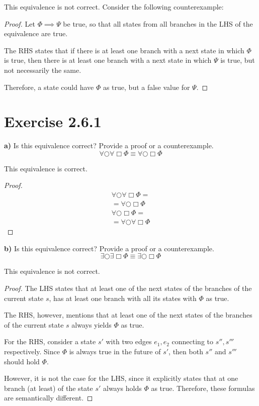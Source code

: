 \documentclass[titlepage, letterpaper, fleqn]{article}
\begin{document}
This equivalence is not correct. Consider the following counterexample:

\begin{proof}
Let \(\Phi \implies \Psi\) be true, so that all states from all branches in the LHS of the equivalence are true.

The RHS states that if there is at least one branch with a next state  in which \(\Phi\) is true, then there is at least one branch with a next state in which \(\Psi\) is true, but not necessarily the same.

Therefore, a state could have \(\Phi\) as true, but a false value for \(\Psi\).
\end{proof}

\pagebreak

\section{Exercise 2.6.1}

{\large \textbf{a)} Is this equivalence correct? Provide a proof or a counterexample.
\[\forall \bigcirc \forall \Box \Phi \equiv \forall \bigcirc \Box \Phi\]}

This equivalence is correct.

\begin{proof}
\begin{align*}
& \forall \bigcirc \forall \Box \Phi =
\\ & = \forall \bigcirc \Box \Phi & \tag*{Quantifier absorption}
\end{align*}
\begin{align*}
& \forall \bigcirc \Box \Phi =
\\ & = \forall \bigcirc \forall \Box \Phi & \tag*{Quantifier absorption}
\end{align*}
\end{proof}

{\large \textbf{b)} Is this equivalence correct? Provide a proof or a counterexample.
\[\exists \bigcirc \exists \Box \Phi \equiv \exists \bigcirc \Box \Phi\]}

This equivalence is not correct.

\begin{proof}
The LHS states that at least one of the next states of the branches of the current state \(s\), has at least one branch with all its states with \(\Phi\) as true.

The RHS, however, mentions that at least one of the next states of the branches of the current state \(s\) always yields \(\Phi\) as true.

For the RHS, consider a state \(s'\) with two edges \(e_1, e_2\) connecting to \(s'', s'''\) respectively. Since \(\Phi\) is always true in the future of \(s'\), then both \(s''\) and \(s'''\) should hold \(\Phi\).

However, it is not the case for the LHS, since it explicitly states that at one branch (at least) of the state \(s'\) always holds \(\Phi\) as true. Therefore, these formulas are semantically different.
\end{proof}
\end{document}
